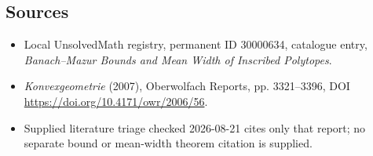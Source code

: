 \documentclass[11pt]{article}
\begin{document}
\subsection{Sources}
\begin{itemize}
\item Local UnsolvedMath registry, permanent ID 30000634, catalogue entry, \emph{Banach--Mazur Bounds and Mean Width of Inscribed Polytopes}.
\item \emph{Konvexgeometrie} (2007), Oberwolfach Reports, pp. 3321--3396, DOI \url{https://doi.org/10.4171/owr/2006/56}.
\item Supplied literature triage checked 2026-08-21 cites only that report; no separate bound or mean-width theorem citation is supplied.
\end{itemize}
\end{document}
